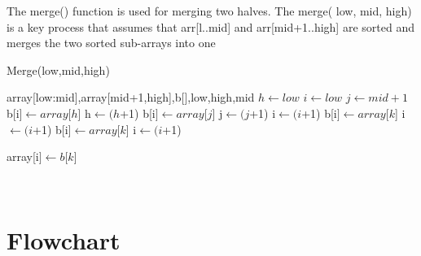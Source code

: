 \documentclass[10pt]{article}
\begin{document}
The merge() function is used for merging two halves. The merge( low, mid, high) is a key process that assumes that arr[l..mid] and arr[mid+1..high] are sorted and merges the two sorted sub-arrays into one\\
\begin{algorithm}
    \caption{Merge(low,mid,high)}
    \begin{algorithmic}
        \Require array[low:mid],array[mid+1,high],b[],low,high,mid
        \State $h \gets low$
        \State $i \gets low$
        \State $j \gets mid+1$
                \State b[i$] \gets array[h$]
                \State h$ \gets (h$+1) 
            \Else
                \State b[i$] \gets array[j$]
                \State j$ \gets (j$+1)
            \EndIf
            \State i$ \gets (i$+1)
        \EndWhile
                    \State b[i$] \gets array[k$]
                    \State i$ \gets (i$+1)
                \EndFor 
        \Else
                    \State b[i$] \gets array[k$]
                    \State i$ \gets (i$+1)
                \EndFor
        \EndIf
                    
                    \State array[i$] \gets b[k$]
        \EndFor
    \end{algorithmic}
\end{algorithm}\\
\pagebreak
\section{Flowchart}
\end{document}

